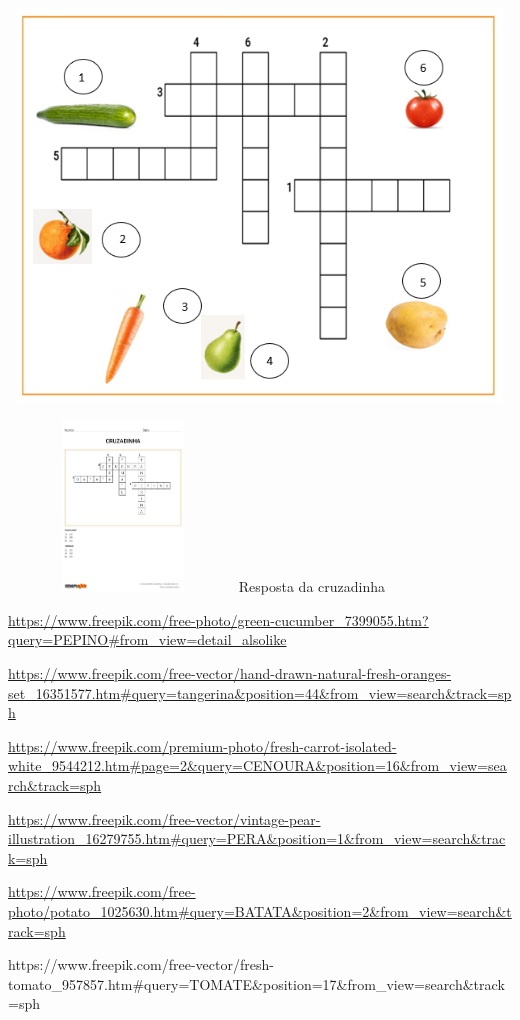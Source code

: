 {\includegraphics[width=5.69167in,height=4.10139in]{media/image40.png}

\includegraphics[width=2.40385in,height=1.79075in]{media/image41.jpeg}Resposta
da cruzadinha

\url{https://www.freepik.com/free-photo/green-cucumber_7399055.htm?query=PEPINO\#from_view=detail_alsolike}

\url{https://www.freepik.com/free-vector/hand-drawn-natural-fresh-oranges-set_16351577.htm\#query=tangerina\&position=44\&from_view=search\&track=sph}

\url{https://www.freepik.com/premium-photo/fresh-carrot-isolated-white_9544212.htm\#page=2\&query=CENOURA\&position=16\&from_view=search\&track=sph}

\url{https://www.freepik.com/free-vector/vintage-pear-illustration_16279755.htm\#query=PERA\&position=1\&from_view=search\&track=sph}

\url{https://www.freepik.com/free-photo/potato_1025630.htm\#query=BATATA\&position=2\&from_view=search\&track=sph}

https://www.freepik.com/free-vector/fresh-tomato\_957857.htm\#query=TOMATE\&position=17\&from\_view=search\&track=sph

}

